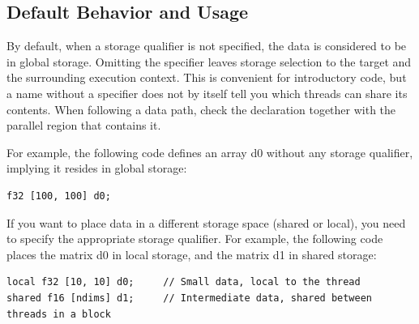 \subsection*{Default Behavior and Usage}

By default, when a storage qualifier is not specified, the data is considered to be in global storage. Omitting the specifier leaves storage selection to the target and the surrounding execution context. This is convenient for introductory code, but a name without a specifier does not by itself tell you which threads can share its contents. When following a data path, check the declaration together with the parallel region that contains it.

For example, the following code defines an array d0 without any storage qualifier, implying it resides in global storage:

\begin{lstlisting}[language=croqtile,caption={A declaration without a specifier}]
f32 [100, 100] d0;
\end{lstlisting}

If you want to place data in a different storage space (shared or local), you need to specify the appropriate storage qualifier. For example, the following code places the matrix d0 in local storage, and the matrix d1 in shared storage:

\begin{lstlisting}[language=croqtile,caption={Choosing local storage explicitly}]
local f32 [10, 10] d0;     // Small data, local to the thread
shared f16 [ndims] d1;     // Intermediate data, shared between threads in a block
\end{lstlisting}
